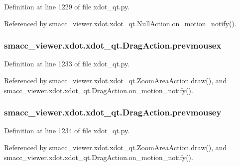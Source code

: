 Definition at line 1229 of file xdot\+\_\+qt.\+py.



Referenced by smacc\+\_\+viewer.\+xdot.\+xdot\+\_\+qt.\+Null\+Action.\+on\+\_\+motion\+\_\+notify().

\subsubsection[{\texorpdfstring{prevmousex}{prevmousex}}]{\setlength{\rightskip}{0pt plus 5cm}smacc\+\_\+viewer.\+xdot.\+xdot\+\_\+qt.\+Drag\+Action.\+prevmousex}\hypertarget{classsmacc__viewer_1_1xdot_1_1xdot__qt_1_1DragAction_a900f12641fa6a10b8f1481533c50705e}{}\label{classsmacc__viewer_1_1xdot_1_1xdot__qt_1_1DragAction_a900f12641fa6a10b8f1481533c50705e}


Definition at line 1233 of file xdot\+\_\+qt.\+py.



Referenced by smacc\+\_\+viewer.\+xdot.\+xdot\+\_\+qt.\+Zoom\+Area\+Action.\+draw(), and smacc\+\_\+viewer.\+xdot.\+xdot\+\_\+qt.\+Drag\+Action.\+on\+\_\+motion\+\_\+notify().

\subsubsection[{\texorpdfstring{prevmousey}{prevmousey}}]{\setlength{\rightskip}{0pt plus 5cm}smacc\+\_\+viewer.\+xdot.\+xdot\+\_\+qt.\+Drag\+Action.\+prevmousey}\hypertarget{classsmacc__viewer_1_1xdot_1_1xdot__qt_1_1DragAction_aee3f8cd173e1043a06b4a08d9f84f536}{}\label{classsmacc__viewer_1_1xdot_1_1xdot__qt_1_1DragAction_aee3f8cd173e1043a06b4a08d9f84f536}


Definition at line 1234 of file xdot\+\_\+qt.\+py.



Referenced by smacc\+\_\+viewer.\+xdot.\+xdot\+\_\+qt.\+Zoom\+Area\+Action.\+draw(), and smacc\+\_\+viewer.\+xdot.\+xdot\+\_\+qt.\+Drag\+Action.\+on\+\_\+motion\+\_\+notify().

